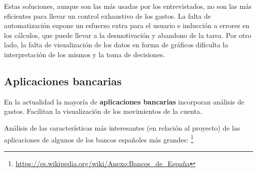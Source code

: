 Estas soluciones, aunque son las más usadas por los entrevistados, no son las más 
eficientes para llevar un control exhaustivo de los gastos. La falta de automatización 
supone un esfuerzo extra para el usuario e inducción a errores en los cálculos, que puede 
llevar a la desmotivación y abandono de la tarea. Por otro lado, la falta de visualización de 
los datos en forma de gráficos dificulta la interpretación de los mismos y la toma de decisiones.\\

\subsection{Aplicaciones bancarias}
En la actualidad la mayoría de \textbf{aplicaciones bancarias} incorporan análisis de gastos. 
Facilitan la visualización de los movimientos de la cuenta. 

Análisis de las características más interesantes (en relación al proyecto) 
de las aplicaciones de algunos de los bancos españoles más grandes:
\footnote{\url{https://es.wikipedia.org/wiki/Anexo:Bancos_de_España}}

